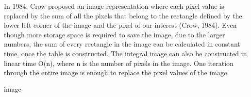 \documentclass{subfiles}
\begin{document}
In 1984, Crow proposed an image representation where each pixel value is replaced by the sum of all the pixels that belong to the rectangle defined by the lower left corner of the image and the pixel of our interest (Crow, 1984).  Even though more storage space is required to save the image, due to the larger numbers, the sum of every rectangle in the image can be calculated in constant time, once the table is constructed. The integral image can also be constructed in linear time O(n), where n is the number of pixels in the image. One iteration through the entire image is enough to replace the pixel values of the image. \newline

image
\newline
\end{document}
